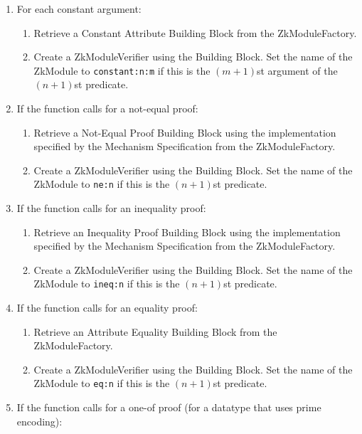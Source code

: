 \begin{enumerate}
\begin{enumerate}
          \item For each constant argument:
            \begin{enumerate}
              \item Retrieve a Constant Attribute Building Block from the ZkModuleFactory.
              \item Create a ZkModuleVerifier using the Building Block. Set the name of the ZkModule to
                \texttt{constant:n:m} if this is the $(m+1)$st argument of the $(n+1)$st predicate.
            \end{enumerate}
          \item If the function calls for a not-equal proof: \notimplemented
            \begin{enumerate}
              \item Retrieve a Not-Equal Proof Building Block using the implementation specified by the Mechanism Specification from the ZkModuleFactory.
              \item Create a ZkModuleVerifier using the Building Block. Set the name of the ZkModule to
                \texttt{ne:n} if this is the $(n+1)$st predicate.
            \end{enumerate}
          \item If the function calls for an inequality proof:
            \begin{enumerate}
              \item Retrieve an Inequality Proof Building Block using the implementation specified by the Mechanism Specification from the ZkModuleFactory.
              \item Create a ZkModuleVerifier using the Building Block. Set the name of the ZkModule to
                \texttt{ineq:n} if this is the $(n+1)$st predicate.
            \end{enumerate}
          \item If the function calls for an equality proof:
            \begin{enumerate}
              \item Retrieve an Attribute Equality Building Block from the ZkModuleFactory.
              \item Create a ZkModuleVerifier using the Building Block. Set the name of the ZkModule to
                \texttt{eq:n} if this is the $(n+1)$st predicate.
            \end{enumerate}
          \item If the function calls for a one-of proof (for a datatype that uses prime encoding): \notimplemented

\end{enumerate}
\end{enumerate}
